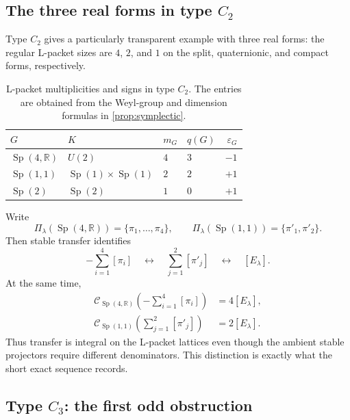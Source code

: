 \documentclass[11pt]{amsart}
\theoremstyle{definition}
\theoremstyle{remark}
\newcommand{\R}{\mathbb R}
\newcommand{\Sp}{\operatorname{Sp}}
\begin{document}
\subsection{The three real forms in type \texorpdfstring{$C_2$}{C2}}

Type $C_2$ gives a particularly transparent example with three real forms: the regular L-packet sizes are $4$, $2$, and $1$ on the split, quaternionic, and compact forms, respectively.

\begin{table}[ht]
\centering
\caption{L-packet multiplicities and signs in type $C_2$.  The entries are obtained from the Weyl-group and dimension formulas in \cref{prop:symplectic}.}
\label{tab:C2}
\begin{tabular}{@{}llllr@{}}
\toprule
$G$ & $K$ & $m_G$ & $q(G)$ & $\varepsilon_G$\\
\midrule
$\Sp(4,\R)$ & $U(2)$ & $4$ & $3$ & $-1$\\
$\Sp(1,1)$ & $\Sp(1)\times\Sp(1)$ & $2$ & $2$ & $+1$\\
$\Sp(2)$ & $\Sp(2)$ & $1$ & $0$ & $+1$\\
\bottomrule
\end{tabular}
\end{table}

Write
\[
  \Pi_\lambda(\Sp(4,\R))=\{\pi_1,\ldots,\pi_4\},
  \qquad
  \Pi_\lambda(\Sp(1,1))=\{\pi'_1,\pi'_2\}.
\]
Then stable transfer identifies
\begin{equation}\label{eq:C2-transfer}
  -\sum_{i=1}^4[\pi_i]
  \quad\longleftrightarrow\quad
  \sum_{j=1}^2[\pi'_j]
  \quad\longleftrightarrow\quad
  [E_\lambda].
\end{equation}
At the same time,
\begin{align*}
  \mathcal C_{\Sp(4,\R)}
  \left(-\sum_{i=1}^4[\pi_i]\right)&=4[E_\lambda],\\
  \mathcal C_{\Sp(1,1)}
  \left(\sum_{j=1}^2[\pi'_j]\right)&=2[E_\lambda].
\end{align*}
Thus transfer is integral on the L-packet lattices even though the ambient stable projectors require different denominators.  This distinction is exactly what the short exact sequence records.

\subsection{Type \texorpdfstring{$C_3$}{C3}: the first odd obstruction}
\end{document}
